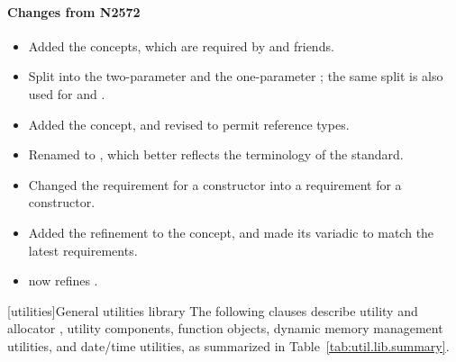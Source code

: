 \documentclass[american,twoside]{book}
\begin{document}
\begin{titlepage}

\paragraph*{Changes from N2572}
\begin{itemize}
\item Added the  concepts, which are required by
   and friends.
\item Split  into the two-parameter
   and the one-parameter ;
  the same split is also used for  and
  .
\item Added the  concept, and revised
   to permit reference types.
\item Renamed  to ,
  which better reflects the terminology of the standard.
\item Changed the  requirement for a  constructor into a requirement for a 
  constructor.
\item Added the  refinement to the
   concept, and made its  variadic
  to match the latest  requirements.
\item {} now refines .
\end{itemize}

\end{titlepage}

\pagestyle{fancy}
\fancyhead[LE,RO]{\textbf{\rightmark}}
\fancyhead[RE]{\textbf{\leftmark\hspace{1em}\thepage}}
\fancyhead[LO]{\textbf{\thepage\hspace{1em}\leftmark}}


\renewcommand{\sectionmark}[1]{\markright{\thesection\hspace{1em}#1}}
\renewcommand{\chaptermark}[1]{\markboth{#1}{}}

\setcounter{chapter}{19}
[utilities]{General utilities library}
\setcounter{Paras}{1}
\textcolor{black}{\pnum}
The following clauses describe utility and allocator , utility
components,  function objects, dynamic
memory management utilities, and date/time utilities, as summarized in
Table~\ref{tab:util.lib.summary}.
\end{document}
